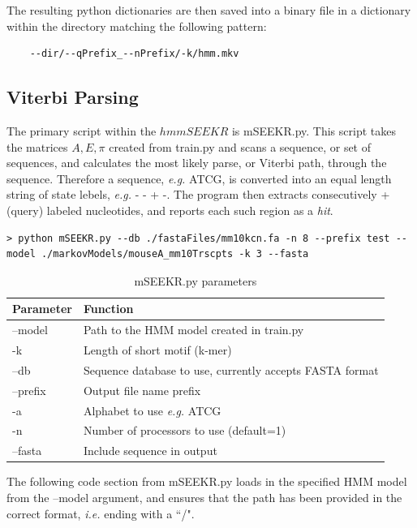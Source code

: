 
The resulting python dictionaries are then saved into a binary file in a dictionary within the directory matching the following pattern:

\begin{verbatim}
    --dir/--qPrefix_--nPrefix/-k/hmm.mkv
\end{verbatim}
\subsection{Viterbi Parsing}
The primary script within the $hmmSEEKR$ is mSEEKR.py. This script takes the matrices $A,E,\pi$ created from train.py and scans a sequence, or set of sequences, and calculates the most likely parse, or Viterbi path, through the sequence. Therefore a sequence, \emph{e.g.} ATCG, is converted into an equal length string of state lebels, \emph{e.g.} - - + -. The program then extracts consecutively + (query) labeled nucleotides, and reports each such region as a \emph{hit}. 

\begin{verbatim}
> python mSEEKR.py --db ./fastaFiles/mm10kcn.fa -n 8 --prefix test --model ./markovModels/mouseA_mm10Trscpts -k 3 --fasta
\end{verbatim}

\begin{table}[h]
\centering
 \begin{tabular}{|l l|}
 \hline
 Parameter & Function\\
 \hline
 --model & Path to the HMM model created in train.py \\
 -k & Length of short motif (k-mer) \\
 --db & Sequence database to use, currently accepts FASTA format\\
 --prefix & Output file name prefix \\
 -a & Alphabet to use \emph{e.g.} ATCG \\
 -n & Number of processors to use (default=1)\\
 --fasta & Include sequence in output \\
 \hline
 
\end{tabular}
\caption{mSEEKR.py parameters}
\label{tab:viterbiparams}
\end{table}

The following code section from mSEEKR.py loads in the specified HMM model from the --model argument, and ensures that the path has been provided in the correct format, \emph{i.e.} ending with a ``/". 


